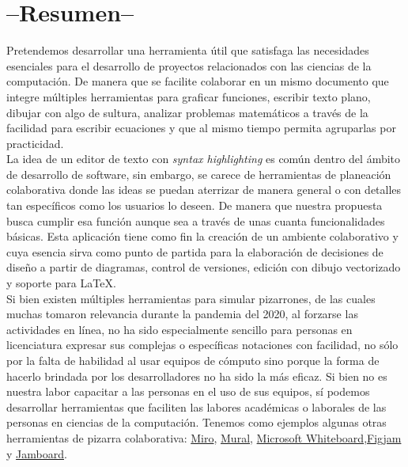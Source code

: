 \documentclass[a4paper, oneside, final]{scrartcl}
\begin{document}


\section{--Resumen--}

Pretendemos desarrollar una herramienta útil que satisfaga las
necesidades esenciales para el desarrollo de proyectos relacionados con las ciencias de la computación. De manera que se facilite colaborar en un mismo documento que integre múltiples herramientas para graficar funciones, escribir texto plano, dibujar con algo de sultura, analizar problemas matemáticos a través de la facilidad para escribir ecuaciones y que al mismo tiempo permita agruparlas por practicidad.\\

La idea de un editor de texto con \textit{syntax highlighting} es común dentro
del ámbito de desarrollo de software, sin embargo, se carece de herramientas de
planeación colaborativa donde las ideas se puedan aterrizar de manera general o
con detalles tan específicos como los usuarios lo deseen. De manera que nuestra propuesta busca cumplir esa función aunque sea a través de unas cuanta funcionalidades básicas. Esta aplicación tiene como fin la creación de un ambiente colaborativo y cuya
esencia sirva como punto de partida para la elaboración de decisiones de diseño
a partir de diagramas, control de versiones, edición con dibujo vectorizado y
soporte para \LaTeX.\\

Si bien existen múltiples herramientas para simular pizarrones, de las cuales muchas tomaron relevancia durante la pandemia del 2020, al forzarse las actividades en línea, no ha sido especialmente sencillo para personas en licenciatura expresar sus complejas o específicas notaciones con facilidad, no sólo por la falta de habilidad al usar equipos de cómputo sino porque la forma de hacerlo brindada por los desarrolladores no ha sido la más eficaz. Si bien no es nuestra labor capacitar a las personas en el uso de sus equipos, sí podemos desarrollar herramientas que faciliten las labores académicas o laborales de las personas en ciencias de la computación.
Tenemos como ejemplos algunas otras herramientas de pizarra colaborativa: \href{https://miro.com/}{Miro}, \href{https://www.mural.co/}{Mural}, \href{ https://www.microsoft.com/en-us/microsoft-365/microsoft-whiteboard/digital-whiteboard-app}{Microsoft Whiteboard},\href{https://www.figma.com/figjam/}{Figjam} y \href{https://jamboard.google.com}{Jamboard}.
\end{document}
